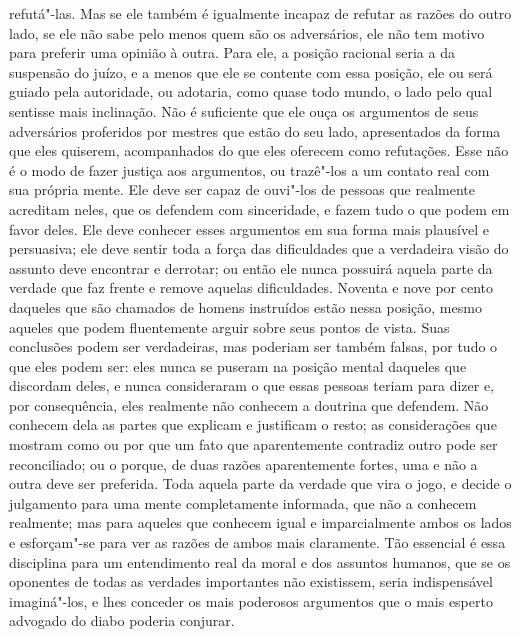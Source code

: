 refutá"-las. Mas se ele também é igualmente incapaz de refutar as
razões do outro lado, se ele não sabe pelo menos quem são os
adversários, ele não tem motivo para preferir uma opinião à outra. Para
ele, a posição racional seria a da suspensão do juízo, e a menos que
ele se contente com essa posição, ele ou será guiado pela autoridade,
ou adotaria, como quase todo mundo, o lado pelo qual sentisse mais
inclinação. Não é suficiente que ele ouça os argumentos de seus
adversários proferidos por mestres que estão do seu lado, apresentados da forma que
eles quiserem, acompanhados do que eles oferecem como refutações. Esse
não é o modo de fazer justiça aos argumentos, ou trazê"-los a um
contato real com sua própria mente. Ele deve ser capaz de ouvi"-los de
pessoas que realmente acreditam neles, que os defendem com sinceridade,
e fazem tudo o que podem em favor deles. Ele deve conhecer esses
argumentos em sua forma mais plausível e persuasiva; ele deve sentir
toda a força das dificuldades que a verdadeira visão do assunto deve
encontrar e derrotar; ou então ele nunca possuirá aquela parte da
verdade que faz frente e remove aquelas dificuldades. Noventa e nove
por cento daqueles que são chamados de homens instruídos estão nessa
posição, mesmo aqueles que podem fluentemente arguir sobre seus pontos
de vista. Suas conclusões podem ser verdadeiras, mas poderiam ser também
falsas, por tudo o que eles podem ser: eles nunca se puseram na posição
mental daqueles que discordam deles, e nunca consideraram o que essas
pessoas teriam para dizer e, por consequência, eles realmente não
conhecem a doutrina que defendem. Não conhecem dela as partes que
explicam e justificam o resto; as considerações que mostram como ou por que um
fato que aparentemente contradiz outro pode ser reconciliado;
ou o porque, de duas razões aparentemente fortes, uma e não a outra
deve ser preferida. Toda aquela parte da verdade que vira o jogo, e
decide o julgamento para uma mente completamente informada, que não 
a conhecem realmente; mas para aqueles que conhecem igual e imparcialmente
ambos os lados e esforçam"-se para ver as razões de ambos mais claramente. 
Tão essencial é essa disciplina para um entendimento real da moral e dos assuntos humanos,
que se os oponentes de todas as verdades importantes não existissem,
seria indispensável imaginá"-los, e lhes conceder os mais poderosos
argumentos que o mais esperto advogado do diabo poderia conjurar. 

